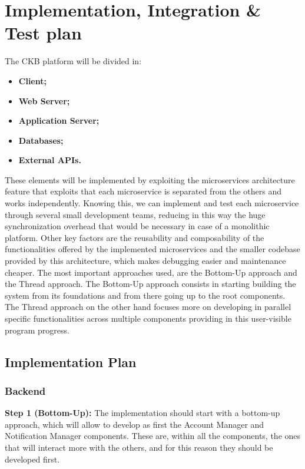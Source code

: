 \documentclass{article}
\begin{document}
{\newpage
\pagestyle{ImplementationIntegrationTestStyle}
\section{Implementation, Integration \& Test plan}
    The CKB platform will be divided in:
    \begin{itemize}
        \item \textbf{Client;}
        \item \textbf{Web Server;}
        \item \textbf{Application Server;}
        \item \textbf{Databases;}
        \item \textbf{External APIs.}
    \end{itemize}
    These elements will be implemented by exploiting the microservices architecture feature that 
    exploits that each microservice is separated from the others and works independently.
    Knowing this, we can implement and test each microservice through several small 
    development teams, reducing in this way the huge synchronization overhead that would be
    necessary in case of a monolithic platform. 
    Other key factors are the reusability and composability of the functionalities offered by the
    implemented microservices and the smaller codebase provided by this architecture, which makes
    debugging easier and maintenance cheaper.
    The most important approaches used, are the Bottom-Up approach and the Thread approach.
    The Bottom-Up approach consists in starting building the system from its foundations and
    from there going up to the root components.
    The Thread approach on the other hand focuses more on developing in parallel specific 
    functionalities across multiple components providing in this user-visible program progress.

    \subsection{Implementation Plan}
        \subsubsection{Backend}
        \textbf{Step 1 (Bottom-Up):} The implementation should start with a bottom-up approach, which
        will allow to develop as first the Account Manager and Notification Manager components.
        These are, within all the components, the ones that will interact more with the others, and
        for this reason they should be developed first.
        
}
\end{document}
